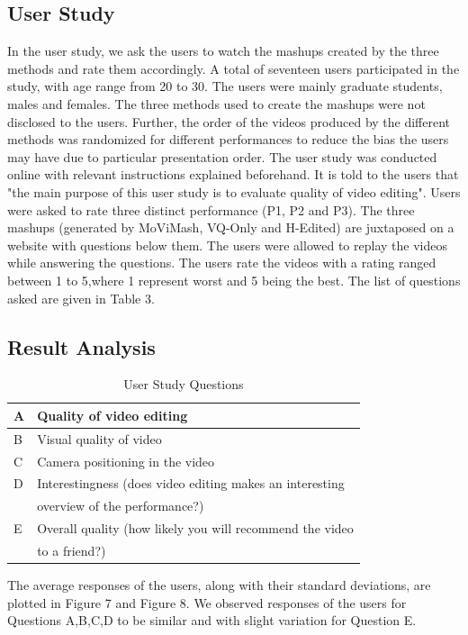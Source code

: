 \documentclass{sig-alternate}
\begin{document}
\subsection{User Study}
 In the user study, we ask the users to watch the mashups created by the three methods and rate them accordingly. A total of seventeen users participated in the study, with age range from 20 to 30. The users were mainly graduate students, males and females. The three methods used to create the mashups were not disclosed to the users. Further, the order of the videos produced by the different methods was randomized for different performances to reduce the bias the users may have due to particular presentation order. The user study was conducted online with relevant instructions explained beforehand. It is told to the users that "the main purpose of this user study is to evaluate quality of video editing". Users were asked to rate three distinct performance (P1, P2 and P3). The three mashups (generated by MoViMash, VQ-Only and H-Edited) are juxtaposed on a website with questions below them. The users were allowed to replay the videos while answering the questions. The users rate the videos with a rating ranged between 1 to 5,where 1 represent worst and 5 being the best. The list of questions asked are given in Table 3. 

\subsection{Result Analysis}
\begin{table}
\centering
\caption{ User Study Questions }
\begin{tabular}{p{0.3cm}|p{8cm}} \hline
A& Quality of video editing\\ \hline
B&Visual quality of video\\ \hline
C& Camera positioning in the video\\ \hline
D& Interestingness (does video editing makes an interesting\\ 
& overview of the performance?)\\ \hline
E &Overall quality (how likely you will recommend the video \\
& to a friend?)\\ \hline
\end{tabular}
\end{table}

The average responses of the users, along with their standard deviations, are plotted in Figure 7 and Figure 8. We observed responses of the users for Questions A,B,C,D to be similar and with slight variation for Question E.
\end{document}
